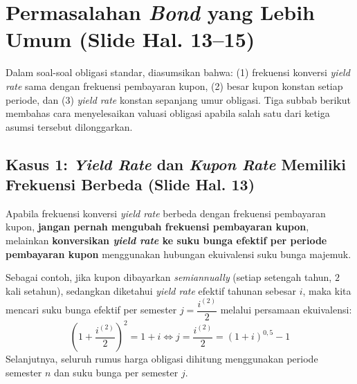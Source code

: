 \documentclass[11pt,a4paper]{article}
\begin{document}
\section{Permasalahan \textit{Bond} yang Lebih Umum (Slide Hal. 13--15)}

Dalam soal-soal obligasi standar, diasumsikan bahwa: (1) frekuensi konversi \textit{yield rate} sama dengan frekuensi pembayaran kupon, (2) besar kupon konstan setiap periode, dan (3) \textit{yield rate} konstan sepanjang umur obligasi. Tiga subbab berikut membahas cara menyelesaikan valuasi obligasi apabila salah satu dari ketiga asumsi tersebut dilonggarkan.

\subsection{Kasus 1: \textit{Yield Rate} dan \textit{Kupon Rate} Memiliki Frekuensi Berbeda (Slide Hal. 13)}

\begin{theorembox}
Apabila frekuensi konversi \textit{yield rate} berbeda dengan frekuensi pembayaran kupon, \textbf{jangan pernah mengubah frekuensi pembayaran kupon}, melainkan \textbf{konversikan \textit{yield rate} ke suku bunga efektif per periode pembayaran kupon} menggunakan hubungan ekuivalensi suku bunga majemuk.
\end{theorembox}

Sebagai contoh, jika kupon dibayarkan \textit{semiannually} (setiap setengah tahun, $2$ kali setahun), sedangkan diketahui \textit{yield rate} efektif tahunan sebesar $i$, maka kita mencari suku bunga efektif per semester $j = \dfrac{i^{(2)}}{2}$ melalui persamaan ekuivalensi:
\begin{equation}
    \left(1 + \frac{i^{(2)}}{2}\right)^2 = 1 + i \iff j = \frac{i^{(2)}}{2} = (1 + i)^{0{,}5} - 1
\end{equation}
Selanjutnya, seluruh rumus harga obligasi dihitung menggunakan periode semester $n$ dan suku bunga per semester $j$.
\end{document}
